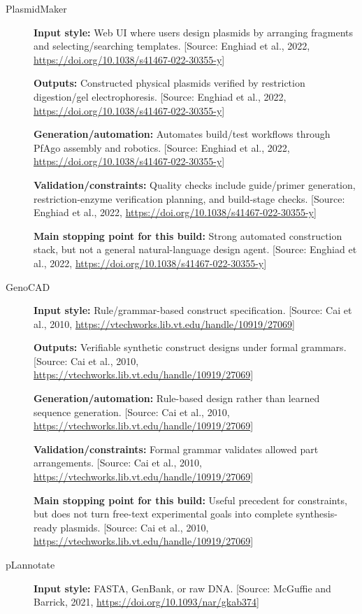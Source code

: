 \documentclass[11pt]{report}
\begin{document}
\begin{description}
\item[PlasmidMaker]
\textbf{Input style:} Web UI where users design plasmids by arranging fragments and selecting/searching templates. [Source: Enghiad et al., 2022, \url{https://doi.org/10.1038/s41467-022-30355-y}]\par
\textbf{Outputs:} Constructed physical plasmids verified by restriction digestion/gel electrophoresis. [Source: Enghiad et al., 2022, \url{https://doi.org/10.1038/s41467-022-30355-y}]\par
\textbf{Generation/automation:} Automates build/test workflows through PfAgo assembly and robotics. [Source: Enghiad et al., 2022, \url{https://doi.org/10.1038/s41467-022-30355-y}]\par
\textbf{Validation/constraints:} Quality checks include guide/primer generation, restriction-enzyme verification planning, and build-stage checks. [Source: Enghiad et al., 2022, \url{https://doi.org/10.1038/s41467-022-30355-y}]\par
\textbf{Main stopping point for this build:} Strong automated construction stack, but not a general natural-language design agent. [Source: Enghiad et al., 2022, \url{https://doi.org/10.1038/s41467-022-30355-y}]\par
\item[GenoCAD]
\textbf{Input style:} Rule/grammar-based construct specification. [Source: Cai et al., 2010, \url{https://vtechworks.lib.vt.edu/handle/10919/27069}]\par
\textbf{Outputs:} Verifiable synthetic construct designs under formal grammars. [Source: Cai et al., 2010, \url{https://vtechworks.lib.vt.edu/handle/10919/27069}]\par
\textbf{Generation/automation:} Rule-based design rather than learned sequence generation. [Source: Cai et al., 2010, \url{https://vtechworks.lib.vt.edu/handle/10919/27069}]\par
\textbf{Validation/constraints:} Formal grammar validates allowed part arrangements. [Source: Cai et al., 2010, \url{https://vtechworks.lib.vt.edu/handle/10919/27069}]\par
\textbf{Main stopping point for this build:} Useful precedent for constraints, but does not turn free-text experimental goals into complete synthesis-ready plasmids. [Source: Cai et al., 2010, \url{https://vtechworks.lib.vt.edu/handle/10919/27069}]\par
\item[pLannotate]
\textbf{Input style:} FASTA, GenBank, or raw DNA. [Source: McGuffie and Barrick, 2021, \url{https://doi.org/10.1093/nar/gkab374}]\par

\end{description}
\end{document}
